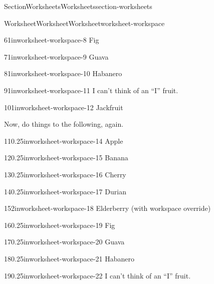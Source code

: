 \documentclass[oneside,10pt,]{article}
\numberwithin{equation}{section}
\begin{document}
\begin{sectionptx}{Section}{Worksheets}{}{Worksheets}{}{}{section-worksheets}
\begin{worksheet-subsection}{Worksheet}{Worksheet}{}{Worksheet}{}{}{worksheet-workspace}
\begin{divisionexercise}{6}{}{1in}{worksheet-workspace-8}%
Fig%
\end{divisionexercise}%
\begin{divisionexercise}{7}{}{1in}{worksheet-workspace-9}%
Guava%
\end{divisionexercise}%
\begin{divisionexercise}{8}{}{1in}{worksheet-workspace-10}%
Habanero%
\end{divisionexercise}%
\begin{divisionexercise}{9}{}{1in}{worksheet-workspace-11}%
I can't think of an \textquotedblleft{}I\textquotedblright{} fruit.%
\end{divisionexercise}%
\begin{divisionexercise}{10}{}{1in}{worksheet-workspace-12}%
Jackfruit%
\end{divisionexercise}%
Now, do things to the following, again.%
\begin{divisionexercise}{11}{}{0.25in}{worksheet-workspace-14}%
Apple%
\end{divisionexercise}%
\begin{divisionexercise}{12}{}{0.25in}{worksheet-workspace-15}%
Banana%
\end{divisionexercise}%
\begin{divisionexercise}{13}{}{0.25in}{worksheet-workspace-16}%
Cherry%
\end{divisionexercise}%
\begin{divisionexercise}{14}{}{0.25in}{worksheet-workspace-17}%
Durian%
\end{divisionexercise}%
\begin{divisionexercise}{15}{}{2in}{worksheet-workspace-18}%
Elderberry (with workspace override)%
\end{divisionexercise}%
\begin{divisionexercise}{16}{}{0.25in}{worksheet-workspace-19}%
Fig%
\end{divisionexercise}%
\begin{divisionexercise}{17}{}{0.25in}{worksheet-workspace-20}%
Guava%
\end{divisionexercise}%
\begin{divisionexercise}{18}{}{0.25in}{worksheet-workspace-21}%
Habanero%
\end{divisionexercise}%
\begin{divisionexercise}{19}{}{0.25in}{worksheet-workspace-22}%
I can't think of an \textquotedblleft{}I\textquotedblright{} fruit.%
\end{divisionexercise}%

\end{worksheet-subsection}
\end{sectionptx}
\end{document}
